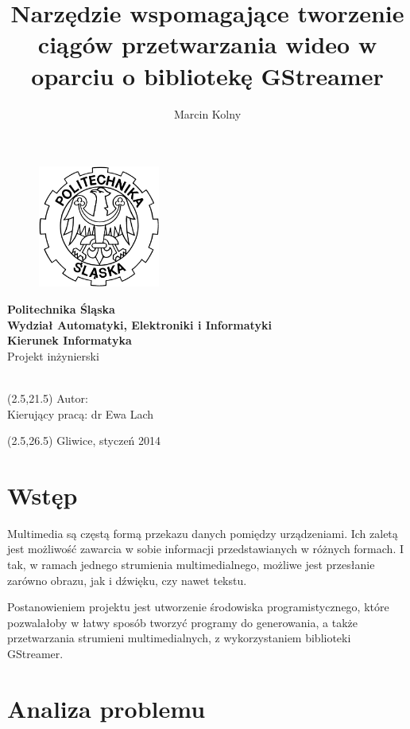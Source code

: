 \documentclass[12pt]{article}
\title{Narzędzie wspomagające tworzenie ciągów przetwarzania wideo w oparciu o bibliotekę GStreamer}
\author{Marcin Kolny}
\renewcommand{\maketitle}{
  \begin{titlepage}
    \begin{figure}  
      \includegraphics[width=40mm]{img/polsl-logo.png}
    \end{figure}
    \begin{center}
      \begingroup
      \fontsize{18pt}{21pt}\selectfont
      \textbf{Politechnika Śląska\\
        Wydział Automatyki, Elektroniki i Informatyki\\
        Kierunek Informatyka}\\
      \vspace{22mm}
      Projekt inżynierski\\
      \vspace{22mm}
      \endgroup
      \begingroup
      \fontsize{14pt}{17pt}\selectfont
      \thetitle \\
      \endgroup
      \vspace{30mm}
    \end{center}
    \begin{textblock}{14}(2.5,21.5)
      \fontsize{14pt}{17pt}\selectfont
      Autor: \theauthor \\
      Kierujący pracą: dr Ewa Lach\\
    \end{textblock}
    \begin{textblock}{20}(2.5,26.5)
      \fontsize{14pt}{17pt}\selectfont
      Gliwice, styczeń 2014\\
    \end{textblock}

  \end{titlepage}
}
\begin{document}
\maketitle
\tableofcontents
\cleardoublepage
\section{Wstęp}
Multimedia są częstą formą przekazu danych pomiędzy urządzeniami. Ich zaletą jest możliwość zawarcia w sobie informacji przedstawianych w różnych formach. I tak, w ramach jednego strumienia multimedialnego, możliwe jest przesłanie zarówno obrazu, jak i dźwięku, czy nawet tekstu. 

\noindent Postanowieniem projektu jest utworzenie środowiska programistycznego, które pozwalałoby w łatwy sposób tworzyć programy do generowania, a także przetwarzania strumieni multimedialnych, z wykorzystaniem biblioteki GStreamer.
\cleardoublepage
\section{Analiza problemu}
\end{document}
